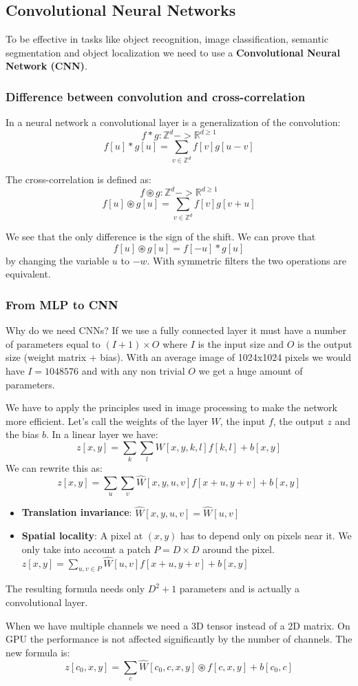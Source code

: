 \subsection{Convolutional Neural Networks}
\label{sec:convolutional_neural_networks}

To be effective in tasks like object recognition, image classification, semantic segmentation and object localization
we need to use a \textbf{Convolutional Neural Network (CNN)}.

\subsubsection{Difference between convolution and cross-correlation}

In a neural network a convolutional layer is a generalization of the convolution:
\[
    f*g:\mathbb{Z}^d->\mathbb{R}^{d\ge1}
\]\[
    f[u]*g[u]=\sum_{v\in\mathbb{Z}^d}f[v]g[u-v]
\]

The cross-correlation is defined as:
\[
    f \circledast g:\mathbb{Z}^d->\mathbb{R}^{d\ge1}
\]\[
    f[u] \circledast g[u]=\sum_{v\in\mathbb{Z}^d}f[v]g[v+u]
\]

We see that the only difference is the sign of the shift.
We can prove that
\[
    f[u] \circledast g[u] = f[-u] * g[u]
\]
by changing the variable $u$ to $-w$.
With symmetric filters the two operations are equivalent.

\subsubsection{From MLP to CNN}

Why do we need CNNs? If we use a fully connected layer
it must have a number of parameters equal to
$(I+1) \times O$ where $I$ is the input size
and $O$ is the output size (weight matrix + bias).
With an average image of 1024x1024 pixels we would have
$I=1048576$ and with any non trivial $O$ we get a huge amount
of parameters.

We have to apply the principles used in image processing to 
make the network more efficient.
Let's call the weights of the layer $W$, the input $f$, the output $z$ and the bias $b$.
In a linear layer we have:
\[
    z[x,y]=\sum_{k}\sum_{l}W[x,y,k,l]f[k,l]+b[x,y]
\]
We can rewrite this as:
\[
    z[x,y]=\sum_{u}\sum_{v}\hat{W}[x,y,u,v]f[x+u,y+v]+b[x,y]
\]

\begin{itemize}
    \item \textbf{Translation invariance}: $\hat{W}[x,y,u,v]=\hat{W}[u,v]$
    \item \textbf{Spatial locality}: A pixel at $(x,y)$ has to depend only on
    pixels near it. We only take into account a patch $P = D\times D$ around the pixel.
    $z[x,y]=\sum_{u,v\in P}\hat{W}[u,v]f[x+u,y+v]+b[x,y]$
\end{itemize}
The resulting formula needs only $D^2+1$ parameters and
is actually a convolutional layer.

When we have multiple channels we need a 3D tensor instead of a 2D matrix.
On GPU the performance is not affected significantly by the number of channels.
The new formula is:
\[
    z[c_0,x,y]=\sum_c\hat{W}[c_0,c,x,y]\circledast f[c,x,y]+b[c_0,c]
\]
